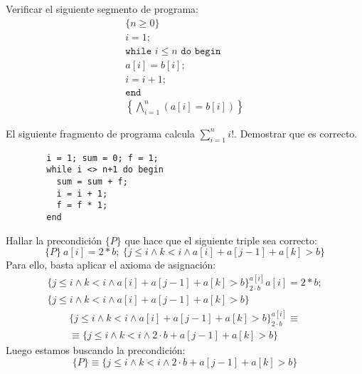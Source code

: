 \begin{ejercicio}
    Verificar el siguiente segmento de programa:
    \begin{gather*}
        \{n\geq 0\}\\ 
        i = 1;\\
        \texttt{while\ } i\leq n \texttt{\ do\ begin}\\
        a[i] = b[i]; \\
        i=i+1;\\
        \texttt{end} \\
        \left\{\bigwedge_{i=1}^n (a[i]=b[i])\right\}
    \end{gather*}
\end{ejercicio}

\begin{ejercicio}
    El siguiente fragmento de programa calcula $\displaystyle\sum_{i=1}^{n} i!$. Demostrar que es correcto.
    \begin{verbatim}
        i = 1; sum = 0; f = 1;
        while i <> n+1 do begin
          sum = sum + f;
          i = i + 1;
          f = f * 1;
        end
    \end{verbatim}
\end{ejercicio}

\begin{ejercicio}
    Hallar la precondición $\{P\}$ que hace que el siguiente triple sea correcto:
    \begin{equation*}
        \{P\}\ a[i]=2\ast b;\ \{j\leq i \land k < i \land a[i] + a[j-1]+a[k]>b\}
    \end{equation*}
    Para ello, basta aplicar el axioma de asignación:
    \begin{gather*}
        \{j\leq i \land k < i \land a[i] + a[j-1]+a[k]>b\}_{2\cdot b}^{a[i]} a[i]=2\ast b;\\ \{j\leq i \land k < i \land a[i] + a[j-1]+a[k]>b\}
    \end{gather*}
    \begin{gather*}
        \{j\leq i \land k < i \land a[i] + a[j-1]+a[k]>b\}_{2\cdot b}^{a[i]} \equiv \\ \equiv \{j\leq i \land k < i \land 2\cdot b + a[j-1]+a[k]>b\}
    \end{gather*}
    Luego estamos buscando la precondición:
    \begin{equation*}
        \{P\} \equiv \{j\leq i \land k < i \land 2\cdot b + a[j-1]+a[k]>b\}
    \end{equation*}
\end{ejercicio}

